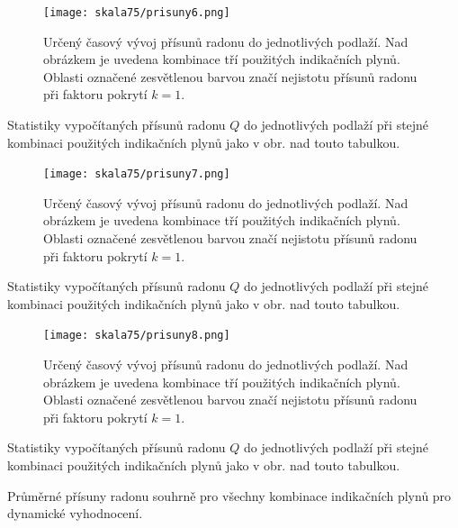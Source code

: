 \begin{figure}[H]
    \centering
    \texttt{[image: skala75/prisuny6.png]}
    \caption{Určený časový vývoj přísunů radonu do jednotlivých podlaží. Nad obrázkem je uvedena kombinace tří použitých indikačních plynů. Oblasti označené zesvětlenou barvou značí nejistotu přísunů radonu při faktoru pokrytí $k=1$.}
    \label{fig:skala75_prisuny6}
\end{figure}
\begin{table}[H]
    \centering
    \caption{Statistiky vypočítaných přísunů radonu $Q$ do jednotlivých podlaží při stejné kombinaci použitých indikačních plynů jako v obr. nad touto tabulkou.}
    \label{tab:skala75_prisuny6}
    
\end{table}

\begin{figure}[H]
    \centering
    \texttt{[image: skala75/prisuny7.png]}
    \caption{Určený časový vývoj přísunů radonu do jednotlivých podlaží. Nad obrázkem je uvedena kombinace tří použitých indikačních plynů. Oblasti označené zesvětlenou barvou značí nejistotu přísunů radonu při faktoru pokrytí $k=1$.}
    \label{fig:skala75_prisuny7}
\end{figure}
\begin{table}[H]
    \centering
    \caption{Statistiky vypočítaných přísunů radonu $Q$ do jednotlivých podlaží při stejné kombinaci použitých indikačních plynů jako v obr. nad touto tabulkou.}
    \label{tab:skala75_prisuny7}
    
\end{table}

\begin{figure}[H]
    \centering
    \texttt{[image: skala75/prisuny8.png]}
    \caption{Určený časový vývoj přísunů radonu do jednotlivých podlaží. Nad obrázkem je uvedena kombinace tří použitých indikačních plynů. Oblasti označené zesvětlenou barvou značí nejistotu přísunů radonu při faktoru pokrytí $k=1$.}
    \label{fig:skala75_prisuny8}
\end{figure}
\begin{table}[H]
    \centering
    \caption{Statistiky vypočítaných přísunů radonu $Q$ do jednotlivých podlaží při stejné kombinaci použitých indikačních plynů jako v obr. nad touto tabulkou.}
    \label{tab:skala75_prisuny8}
    
\end{table}

\begin{table}[H]
    \centering
    \caption{Průměrné přísuny radonu souhrně pro všechny kombinace indikačních plynů pro dynamické vyhodnocení.}
    \label{tab:skala75_prisunyDynamicky}
   
\end{table}
